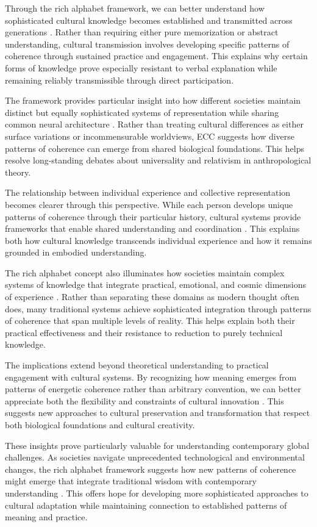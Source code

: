 Through the rich alphabet framework, we can better understand how sophisticated cultural knowledge becomes established and transmitted across generations \cite{whitehouse2004modes}. Rather than requiring either pure memorization or abstract understanding, cultural transmission involves developing specific patterns of coherence through sustained practice and engagement. This explains why certain forms of knowledge prove especially resistant to verbal explanation while remaining reliably transmissible through direct participation.

The framework provides particular insight into how different societies maintain distinct but equally sophisticated systems of representation while sharing common neural architecture \cite{bateson1972steps}. Rather than treating cultural differences as either surface variations or incommensurable worldviews, ECC suggests how diverse patterns of coherence can emerge from shared biological foundations. This helps resolve long-standing debates about universality and relativism in anthropological theory.

The relationship between individual experience and collective representation becomes clearer through this perspective. While each person develops unique patterns of coherence through their particular history, cultural systems provide frameworks that enable shared understanding and coordination \cite{shore1996culture}. This explains both how cultural knowledge transcends individual experience and how it remains grounded in embodied understanding.

The rich alphabet concept also illuminates how societies maintain complex systems of knowledge that integrate practical, emotional, and cosmic dimensions of experience \cite{wagner1981invention}. Rather than separating these domains as modern thought often does, many traditional systems achieve sophisticated integration through patterns of coherence that span multiple levels of reality. This helps explain both their practical effectiveness and their resistance to reduction to purely technical knowledge.

The implications extend beyond theoretical understanding to practical engagement with cultural systems. By recognizing how meaning emerges from patterns of energetic coherence rather than arbitrary convention, we can better appreciate both the flexibility and constraints of cultural innovation \cite{rappaport1999ritual}. This suggests new approaches to cultural preservation and transformation that respect both biological foundations and cultural creativity.

These insights prove particularly valuable for understanding contemporary global challenges. As societies navigate unprecedented technological and environmental changes, the rich alphabet framework suggests how new patterns of coherence might emerge that integrate traditional wisdom with contemporary understanding \cite{bateson1972steps}. This offers hope for developing more sophisticated approaches to cultural adaptation while maintaining connection to established patterns of meaning and practice.